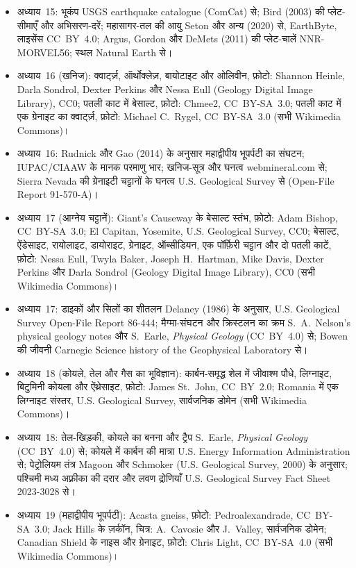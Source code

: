 \begin{itemize}
  \item अध्याय~15: भूकंप USGS earthquake catalogue (ComCat) से; Bird (2003) की प्लेट-सीमाएँ और अभिसरण-दरें; महासागर-तल की आयु Seton और अन्य (2020) से, EarthByte, लाइसेंस CC~BY~4.0; Argus, Gordon और DeMets (2011) की प्लेट-चालें NNR-MORVEL56; स्थल Natural Earth से।
  \item अध्याय~16 (खनिज): क्वार्ट्ज़, ऑर्थोक्लेज़, बायोटाइट और ओलिवीन, फ़ोटो: Shannon Heinle, Darla Sondrol, Dexter Perkins और Nessa Eull (Geology Digital Image Library), CC0; पतली काट में बेसाल्ट, फ़ोटो: Chmee2, CC~BY-SA~3.0; पतली काट में एक ग्रेनाइट का क्वार्ट्ज़, फ़ोटो: Michael C.~Rygel, CC~BY-SA~3.0 (सभी Wikimedia Commons)।
  \item अध्याय~16: Rudnick और Gao (2014) के अनुसार महाद्वीपीय भूपर्पटी का संघटन; IUPAC/CIAAW के मानक परमाणु भार; खनिज-सूत्र और घनत्व webmineral.com से; Sierra Nevada की ग्रेनाइटी चट्टानों के घनत्व U.S. Geological Survey से (Open-File Report 91-570-A)।
  \item अध्याय~17 (आग्नेय चट्टानें): Giant's Causeway के बेसाल्ट स्तंभ, फ़ोटो: Adam Bishop, CC~BY-SA~3.0; El Capitan, Yosemite, U.S. Geological Survey, CC0; बेसाल्ट, ऐंडेसाइट, रायोलाइट, डायोराइट, ग्रेनाइट, ऑब्सीडियन, एक पॉर्फ़िरी चट्टान और दो पतली काटें, फ़ोटो: Nessa Eull, Twyla Baker, Joseph H.~Hartman, Mike Davis, Dexter Perkins और Darla Sondrol (Geology Digital Image Library), CC0 (सभी Wikimedia Commons)।
  \item अध्याय~17: डाइकों और सिलों का शीतलन Delaney (1986) के अनुसार, U.S. Geological Survey Open-File Report 86-444; मैग्मा-संघटन और क्रिस्टलन का क्रम S.~A.~Nelson's physical geology notes और S.~Earle, \emph{Physical Geology} (CC~BY~4.0) से; Bowen की जीवनी Carnegie Science history of the Geophysical Laboratory से।
  \item अध्याय~18 (कोयले, तेल और गैस का भूविज्ञान): कार्बन-समृद्ध शेल में जीवाश्म पौधे, लिग्नाइट, बिटुमिनी कोयला और ऐंथ्रेसाइट, फ़ोटो: James St.~John, CC~BY~2.0; Romania में एक लिग्नाइट संस्तर, U.S. Geological Survey, सार्वजनिक डोमेन (सभी Wikimedia Commons)।
  \item अध्याय~18: तेल-खिड़की, कोयले का बनना और ट्रैप S.~Earle, \emph{Physical Geology} (CC~BY~4.0) से; कोयले में कार्बन की मात्रा U.S. Energy Information Administration से; पेट्रोलियम तंत्र Magoon और Schmoker (U.S. Geological Survey, 2000) के अनुसार; पश्चिमी मध्य अफ़्रीका की दरार और लवण द्रोणियाँ U.S. Geological Survey Fact Sheet 2023-3028 से।
  \item अध्याय~19 (महाद्वीपीय भूपर्पटी): Acasta gneiss, फ़ोटो: Pedroalexandrade, CC~BY-SA~3.0; Jack Hills के ज़र्कॉन, चित्र: A.~Cavosie और J.~Valley, सार्वजनिक डोमेन; Canadian Shield के नाइस और ग्रेनाइट, फ़ोटो: Chris Light, CC~BY-SA~4.0 (सभी Wikimedia Commons)।

\end{itemize}
